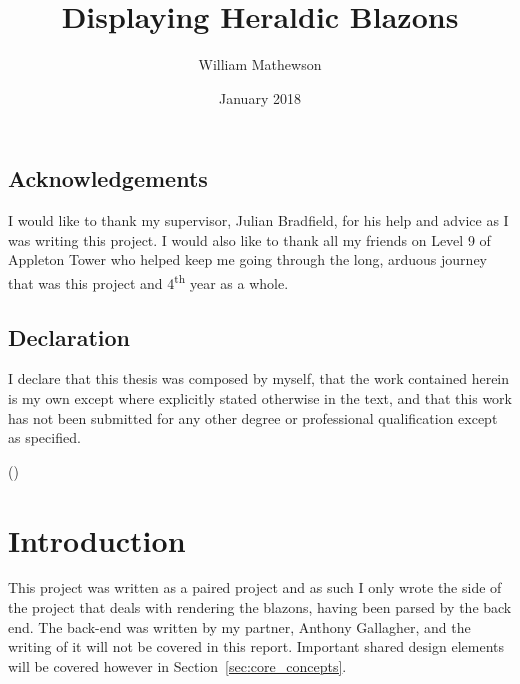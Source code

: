 \documentclass[nobib, a4paper, twoside, justified]{tufte-book}
\title{Displaying Heraldic Blazons}
\author{William Mathewson}
\date{January 2018}
\begin{document}
\frontmatter

\maketitlepage{}


\begin{publicationmeta}
  \section*{Acknowledgements}
  I would like to thank my supervisor, Julian Bradfield, for his help and advice as I was writing
  this project. I would also like to thank all my friends on Level 9 of Appleton Tower who helped
  keep me going through the long, arduous journey that was this project and 4\textsuperscript{th}
  year as a whole.

  \section*{Declaration}
  I declare that this thesis was composed by myself,
  that the work contained herein is my own
  except where explicitly stated otherwise in the text,
  and that this work has not been submitted for any other degree or
  professional qualification except as specified.\par
  ({\textit{\thanklessauthor}})
\end{publicationmeta}

\tableofcontents


\mainmatter{}

\chapter{Introduction}\label{cha:introduction}

This project was written as a paired project and as such I only wrote the side of the project that
deals with rendering the \glspl{blazon}, having been parsed by the back end. The back-end was
written by my partner, Anthony Gallagher, and the writing of it will not be covered in this report.
Important shared design elements will be covered however in Section~\ref{sec:core_concepts}.
\end{document}
